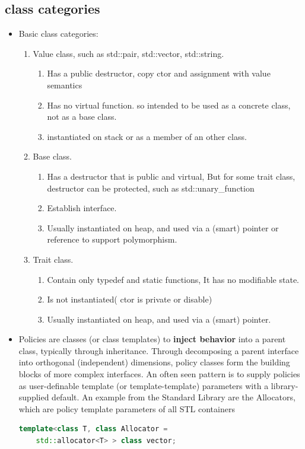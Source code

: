 \documentclass[a4paper,12pt,twoside]{book}
\begin{document}
\subsection{class categories}
\begin{itemize}
	\item Basic class categories:
	\begin{enumerate}
		\item Value class, such as std::pair, std::vector, std::string.
		\begin{enumerate}
			\item Has a public destructor, copy ctor and assignment with value semantics
			\item Has no virtual function. so intended to be used as a concrete class, not as a base class.
			\item instantiated on stack or as a member of an other class.
		\end{enumerate}
		
		\item Base class.
		\begin{enumerate}
			\item Has a destructor that is public and virtual, But for some trait class, destructor can be protected, such as std::unary\_function
			\item Establish interface.
			\item Usually instantiated on heap, and used via a (smart) pointer or reference to support polymorphism.
		\end{enumerate}
		
		\item Trait class.
		\begin{enumerate}
			\item Contain only typedef and static functions, It has no modifiable state.
			\item Is not instantiated( ctor is private or disable)
			\item Usually instantiated on heap, and used via a (smart) pointer.
		\end{enumerate}
	\end{enumerate}
	
	\item Policies are classes (or class templates) to \textbf{inject behavior} into a parent class, typically through inheritance. Through decomposing a parent interface into orthogonal (independent) dimensions, policy classes form the building blocks of more complex interfaces. An often seen pattern is to supply policies as user-definable template (or template-template) parameters with a library-supplied default. An example from the Standard Library are the Allocators, which are policy template parameters of all STL containers
	\begin{lstlisting}[frame=single, language=c++]
	template<class T, class Allocator =
	std::allocator<T> > class vector;
	\end{lstlisting}
	

\end{itemize}
\end{document}
